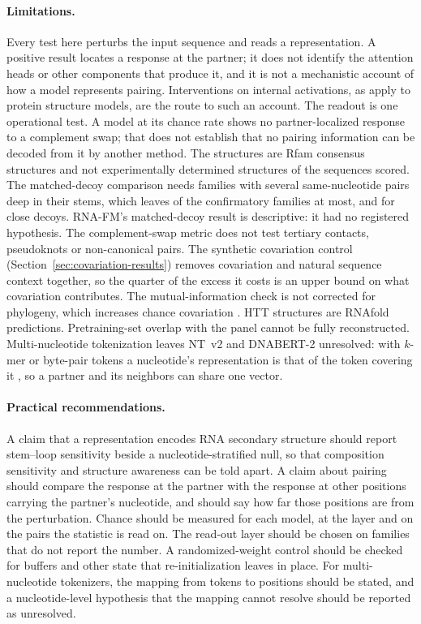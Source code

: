 \documentclass[11pt]{article}
\begin{document}
\paragraph{Limitations.}
Every test here perturbs the input sequence and reads a representation. A
positive result locates a response at the partner; it does not identify the
attention heads or other components that produce it, and it is not a
mechanistic account of how a model represents pairing. Interventions on
internal activations, as \citet{lu2026two} apply to protein structure models,
are the route to such an account. The readout is one
operational test. A model at its chance rate shows no
partner-localized response to a complement swap; that does not establish that
no pairing information can be decoded from it by another method. The
structures are Rfam consensus structures and not experimentally determined
structures of the sequences scored. The matched-decoy comparison needs
families with several same-nucleotide pairs deep in their stems, which leaves
\decoyAllFamiliesErnieRNA{} of the \confirmatoryN{} confirmatory families at
most, and \decoyCloseFamiliesErnieRNA{} for close decoys. RNA-FM's
matched-decoy result is descriptive: it had no registered hypothesis. The
complement-swap metric does not test tertiary contacts, pseudoknots or
non-canonical pairs. The synthetic covariation control
(Section~\ref{sec:covariation-results}) removes covariation and natural
sequence context together, so the quarter of the excess it costs is an upper
bound on what covariation contributes. The mutual-information check is not
corrected for phylogeny, which increases chance covariation
\citep{rivas2017statistical}. HTT structures are RNAfold predictions.
Pretraining-set overlap with the panel cannot be fully reconstructed.
Multi-nucleotide tokenization leaves NT~v2 and DNABERT-2 unresolved: with
$k$-mer or byte-pair tokens a nucleotide's representation is that of the token
covering it \citep{ren2024beacon}, so a partner and its neighbors can share one
vector.

\paragraph{Practical recommendations.}
A claim that a representation encodes RNA secondary structure should report
stem--loop sensitivity beside a nucleotide-stratified null, so that composition
sensitivity and structure awareness can be told apart. A claim about pairing
should compare the response at the partner with the response at other
positions carrying the partner's nucleotide, and should say how far those
positions are from the perturbation. Chance should be measured for each model,
at the layer and on the pairs the statistic is read on. The read-out layer
should be chosen on families that do not report the number. A randomized-weight
control should be checked for buffers and other state that re-initialization
leaves in place. For multi-nucleotide tokenizers, the mapping from tokens to
positions should be stated, and a nucleotide-level hypothesis that the mapping
cannot resolve should be reported as unresolved.
\end{document}
